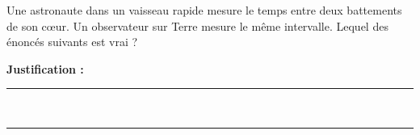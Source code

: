 Une astronaute dans un vaisseau rapide mesure le temps entre deux battements de son cœur. Un observateur sur Terre mesure le même intervalle. Lequel des énoncés suivants est vrai ?

\choices

\noindent\textbf{Justification :} \hrulefill \\[2.5ex]
\rule{\linewidth}{0.4pt} \\[2.5ex]
\rule{\linewidth}{0.4pt}
\vfill
